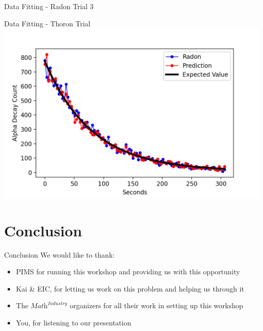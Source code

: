 \documentclass{beamer}
\begin{document}
{\begin{frame}{Data Fitting - Radon Trial 3}
\end{frame}
\begin{frame}{Data Fitting - Thoron Trial}
    \includegraphics[width=\textwidth]{images/Thoron_Trial1.png}
\end{frame}
}
\section{Conclusion}
\begin{frame}{Conclusion}
    We would like to thank:
    \begin{itemize}
        \item PIMS for running this workshop and providing us with this opportunity
        \item Kai \& EIC, for letting us work on this problem and helping us through it
        \item The $\textit{Math}^{\textit{Industry}}$ organizers for all their work in setting up this workshop
        \item You, for listening to our presentation
    \end{itemize}
\end{frame}
\end{document}
